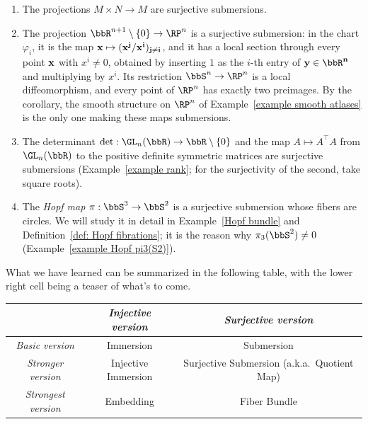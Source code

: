 \begin{example}\label{example submersions}
    \begin{enumerate}
        \item The projections $M\times N\to M$ are surjective submersions.
        \item The projection $\bbR^{n+1}\setminus\{0\}\to\RP^n$ is a surjective submersion: in the chart $\varphi_i$, it is the map $\bf{x}\mapsto(x^j/x^i)_{j\neq i}$, and it has a local section through every point $\bf{x}$ with $x^i\neq0$, obtained by inserting $1$ as the $i$-th entry of $\bf{y}\in\bbR^n$ and multiplying by $x^i$. Its restriction $\bbS^n\to\RP^n$ is a local diffeomorphism, and every point of $\RP^n$ has exactly two preimages. By the corollary, the smooth structure on $\RP^n$ of Example~\ref{example smooth atlases} is the only one making these maps submersions.
        \item The determinant $\det:\GL_n(\bbR)\to\bbR\setminus\{0\}$ and the map $A\mapsto A^\top A$ from $\GL_n(\bbR)$ to the positive definite symmetric matrices are surjective submersions (Example~\ref{example rank}; for the surjectivity of the second, take square roots).
        \item The \emph{Hopf map} $\pi:\bbS^3\to\bbS^2$ is a surjective submersion whose fibers are circles. We will study it in detail in Example~\ref{Hopf bundle} and Definition~\ref{def: Hopf fibrations}; it is the reason why $\pi_3(\bbS^2)\neq0$ (Example~\ref{example Hopf pi3(S2)}).
    \end{enumerate}
\end{example}

What we have learned can be summarized in the following table, with the lower right cell being a teaser of what's to come.

\begin{center}
\begin{tabular}{ccc}
    & \emph{Injective version} & \emph{Surjective version} \\
    \toprule
    \emph{Basic version} & Immersion & Submersion  \\
    \midrule
    \emph{Stronger version}  & Injective Immersion & Surjective Submersion (a.k.a.~Quotient Map) \\
    \midrule
    \emph{Strongest version}  & Embedding & Fiber Bundle \\
    \bottomrule
\end{tabular}
\end{center}

